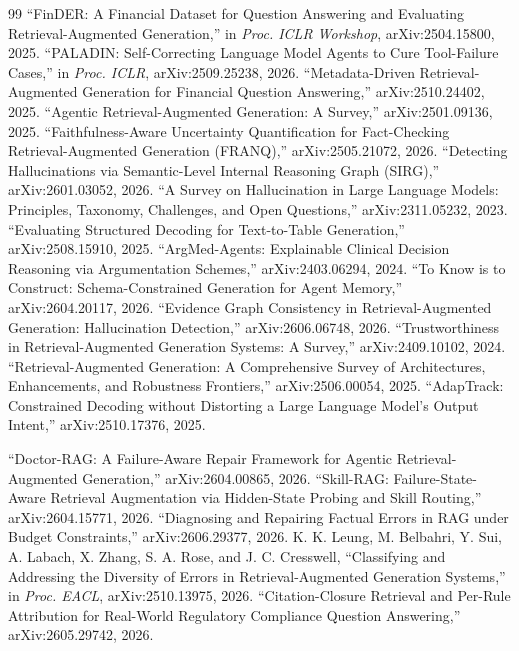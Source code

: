 \documentclass[10pt,twocolumn,letterpaper]{article}
\begin{document}
\begin{thebibliography}{99}
 ``FinDER: A Financial Dataset for Question Answering and Evaluating Retrieval-Augmented Generation,'' in \emph{Proc. ICLR Workshop}, arXiv:2504.15800, 2025.
 ``PALADIN: Self-Correcting Language Model Agents to Cure Tool-Failure Cases,'' in \emph{Proc. ICLR}, arXiv:2509.25238, 2026.
 ``Metadata-Driven Retrieval-Augmented Generation for Financial Question Answering,'' arXiv:2510.24402, 2025.
 ``Agentic Retrieval-Augmented Generation: A Survey,'' arXiv:2501.09136, 2025.
 ``Faithfulness-Aware Uncertainty Quantification for Fact-Checking Retrieval-Augmented Generation (FRANQ),'' arXiv:2505.21072, 2026.
 ``Detecting Hallucinations via Semantic-Level Internal Reasoning Graph (SIRG),'' arXiv:2601.03052, 2026.
 ``A Survey on Hallucination in Large Language Models: Principles, Taxonomy, Challenges, and Open Questions,'' arXiv:2311.05232, 2023.
 ``Evaluating Structured Decoding for Text-to-Table Generation,'' arXiv:2508.15910, 2025.
 ``ArgMed-Agents: Explainable Clinical Decision Reasoning via Argumentation Schemes,'' arXiv:2403.06294, 2024.
 ``To Know is to Construct: Schema-Constrained Generation for Agent Memory,'' arXiv:2604.20117, 2026.
 ``Evidence Graph Consistency in Retrieval-Augmented Generation: Hallucination Detection,'' arXiv:2606.06748, 2026.
 ``Trustworthiness in Retrieval-Augmented Generation Systems: A Survey,'' arXiv:2409.10102, 2024.
 ``Retrieval-Augmented Generation: A Comprehensive Survey of Architectures, Enhancements, and Robustness Frontiers,'' arXiv:2506.00054, 2025.
 ``AdapTrack: Constrained Decoding without Distorting a Large Language Model's Output Intent,'' arXiv:2510.17376, 2025.

 ``Doctor-RAG: A Failure-Aware Repair Framework for Agentic Retrieval-Augmented Generation,'' arXiv:2604.00865, 2026.
 ``Skill-RAG: Failure-State-Aware Retrieval Augmentation via Hidden-State Probing and Skill Routing,'' arXiv:2604.15771, 2026.
 ``Diagnosing and Repairing Factual Errors in RAG under Budget Constraints,'' arXiv:2606.29377, 2026.
 K. K. Leung, M. Belbahri, Y. Sui, A. Labach, X. Zhang, S. A. Rose, and J. C. Cresswell, ``Classifying and Addressing the Diversity of Errors in Retrieval-Augmented Generation Systems,'' in \emph{Proc. EACL}, arXiv:2510.13975, 2026.
 ``Citation-Closure Retrieval and Per-Rule Attribution for Real-World Regulatory Compliance Question Answering,'' arXiv:2605.29742, 2026.


\end{thebibliography}
\end{document}
